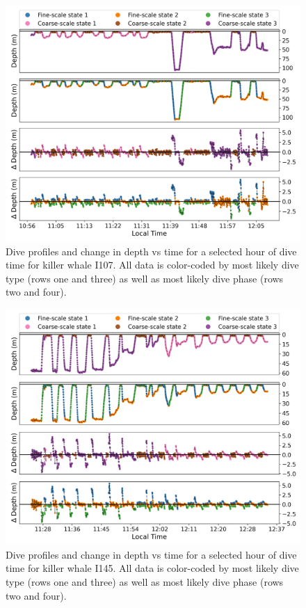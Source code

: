 \documentclass[12pt]{article}
\begin{document}
\begin{figure}[H]
    \centering
    \includegraphics[width=6.5in]{../plt/decoded_dives_kw_I107_K_3_3_nWhales_8.png}
    \caption{Dive profiles and change in depth vs time for a selected hour of dive time for killer whale I107. All data is color-coded by most likely dive type (rows one and three) as well as most likely dive phase (rows two and four).}
    \label{fig:I107}
\end{figure}

\begin{figure}[H]
    \centering
    \includegraphics[width=6.5in]{../plt/decoded_dives_kw_I145_K_3_3_nWhales_8.png}
    \caption{Dive profiles and change in depth vs time for a selected hour of dive time for killer whale I145. All data is color-coded by most likely dive type (rows one and three) as well as most likely dive phase (rows two and four).}
    \label{fig:I145}
\end{figure}
\end{document}
